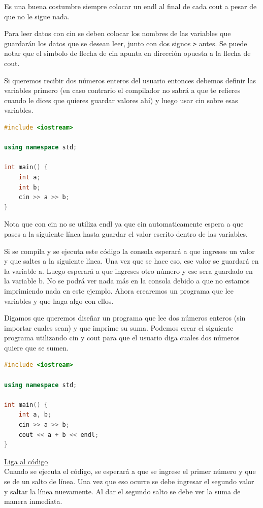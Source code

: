 \documentclass{article}
\begin{document}
Es una buena costumbre siempre colocar un endl al final de cada cout a pesar de que no le sigue nada.

Para leer datos con cin se deben colocar los nombres de las variables que guardarán los datos que se desean leer, junto con dos signos \lstinline{>} antes. Se puede notar que el simbolo de flecha de cin apunta en dirección opuesta a la flecha de cout.

Si queremos recibir dos números enteros del usuario entonces debemos definir las variables primero (en caso contrario el compilador no sabrá a que te refieres cuando le dices que quieres guardar valores ahí) y luego usar cin sobre esas variables.

\begin{lstlisting}[language=C++, title=Leyendo dos enteros]
#include <iostream>

using namespace std;

int main() {
	int a;
	int b;
	cin >> a >> b;
}
\end{lstlisting}

Nota que con cin no se utiliza endl ya que cin automaticamente espera a que pases a la siguiente línea hasta guardar el valor escrito dentro de las variables.

Si se compila y se ejecuta este código la consola esperará a que ingreses un valor y que saltes a la siguiente línea. Una vez que se hace eso, ese valor se guardará en la variable a. Luego esperará a que ingreses otro número y ese sera guardado en la variable b. No se podrá ver nada más en la consola debido a que no estamos imprimiendo nada en este ejemplo. Ahora crearemos un programa que lee variables y que haga algo con ellos.

Digamos que queremos diseñar un programa que lee dos números enteros (sin importar cuales sean) y que imprime su suma. Podemos crear el siguiente programa utilizando cin y cout para que el usuario diga cuales dos números quiere que se sumen.

\begin{lstlisting}[language=C++, title=Suma general]
#include <iostream>

using namespace std;

int main() {
	int a, b;
	cin >> a >> b;
	cout << a + b << endl;
}
\end{lstlisting}
\href{https://repl.it/@Jamesscn/Suma}{Liga al código}\\

Cuando se ejecuta el código, se esperará a que se ingrese el primer número y que se de un salto de línea. Una vez que eso ocurre se debe ingresar el segundo valor y saltar la línea nuevamente. Al dar el segundo salto se debe ver la suma de manera inmediata.
\end{document}
